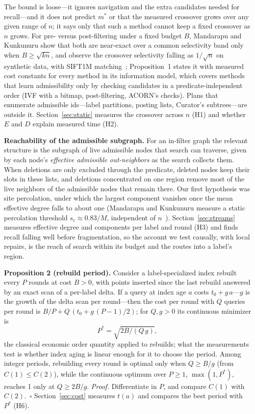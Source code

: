 \documentclass[conference]{IEEEtran}
\begin{document}
The bound is loose---it ignores navigation and the extra candidates needed for recall---and it does not predict $m^\ast$ or that the measured crossover grows over any given range of $n$; it says only that such a method cannot keep a fixed crossover as $n$ grows. For pre- versus post-filtering under a fixed budget $B$, Mandarapu and Kunkunuru show that both are near-exact over a common selectivity band only when $B\ge\sqrt{kn}$, and observe the crossover selectivity falling as $1/\sqrt n$ on synthetic data, with SIFT1M matching~\cite{mandarapu2026}; Proposition~1 states it with measured cost constants for every method in its information model, which covers methods that learn admissibility only by checking candidates in a predicate-independent order (IVF with a bitmap, post-filtering, ACORN's checks). Plans that enumerate admissible ids---label partitions, posting lists, Curator's subtrees---are outside it. Section~\ref{sec:static} measures the crossover across $n$ (H1) and whether $E$ and $D$ explain measured time (H2).

\textbf{Reachability of the admissible subgraph.} For an in-filter graph the relevant structure is the subgraph of live admissible nodes that search can traverse, given by each node's \emph{effective admissible out-neighbors} as the search collects them. When deletions are only excluded through the predicate, deleted nodes keep their slots in these lists, and deletions concentrated on one region remove most of the live neighbors of the admissible nodes that remain there. Our first hypothesis was site percolation, under which the largest component vanishes once the mean effective degree falls to about one (Mandarapu and Kunkunuru measure a static percolation threshold $s_c \approx 0.83/M$, independent of $n$~\cite{mandarapu2026}). Section~\ref{sec:streams} measures effective degree and components per label and round (H3) and finds recall falling well before fragmentation, so the account we test causally, with local repairs, is the reach of search within its budget and the routes into a label's region.

\textbf{Proposition 2 (rebuild period).} Consider a label-specialized index rebuilt every $P$ rounds at cost $B>0$,
with points inserted since the last rebuild answered by an exact scan of a per-label delta. If a query at index age
$a$ costs $t_0 + g\,a$---$g$ is the growth of the delta scan per round---then the cost per round with $Q$ queries per
round is $B/P + Q\,(t_0 + g\,(P-1)/2)$; for $Q,g>0$ its continuous minimizer is
\begin{equation}\label{eq:eoq}
P^\ast = \sqrt{2B/(Q\,g)},
\end{equation}
the classical economic order quantity applied to rebuilds; what the measurements test is whether index aging is linear enough for it to choose the period. Among integer periods, rebuilding every round is optimal only when $Q \ge B/g$ (from $C(1)\le C(2)$), while the continuous optimum over $P\ge1$, $\max(1,P^\ast)$, reaches 1 only at $Q\ge2B/g$. \emph{Proof.} Differentiate in $P$, and compare $C(1)$ with $C(2)$.~$\square$
Section~\ref{sec:cost} measures $t(a)$ and compares the best period with $P^\ast$ (H6).
\end{document}
